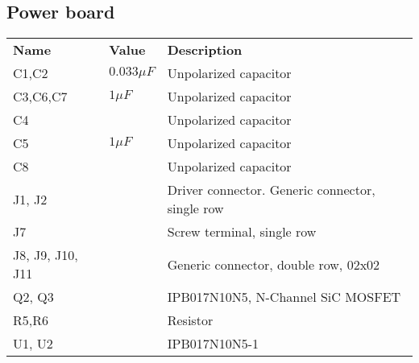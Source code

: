 \subsection{Power board}
\begin{table}[H]
\centering
\small
\begin{tabular}{p{4cm} p{1.5cm} p{8cm}}
\textbf{Name}    & \textbf{Value} & \textbf{Description}                            \\
C1,C2            & $0.033\mu F$   & Unpolarized capacitor                           \\
C3,C6,C7         & $1\mu F$       & Unpolarized capacitor                           \\
C4               &                & Unpolarized capacitor                           \\
C5               & $1\mu F$       & Unpolarized capacitor                           \\
C8               &                & Unpolarized capacitor                           \\
J1, J2           &                & Driver connector. Generic connector, single row \\
J7               &                & Screw terminal, single row                      \\
J8, J9, J10, J11 &                & Generic connector, double row, 02x02            \\
Q2, Q3           &                & IPB017N10N5, N-Channel SiC MOSFET               \\
R5,R6            &                & Resistor                                        \\
U1, U2           &                & IPB017N10N5-1                                  
\end{tabular}
\end{table}
